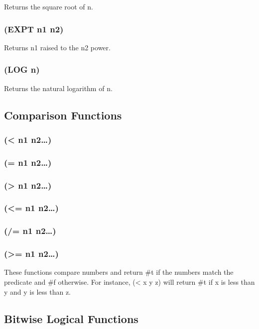 \documentclass[11pt]{article}
\begin{document}
Returns the square root of n.
\subsubsection{(EXPT n1 n2)}
\label{sec-4-25-40}

Returns n1 raised to the n2 power.
\subsubsection{(LOG n)}
\label{sec-4-25-41}

Returns the natural logarithm of n.
\subsection{Comparison Functions}
\label{sec-4-26}

\subsubsection{(< n1 n2\ldots{})}
\label{sec-4-26-1}
\subsubsection{(= n1 n2\ldots{})}
\label{sec-4-26-2}
\subsubsection{(> n1 n2\ldots{})}
\label{sec-4-26-3}
\subsubsection{(<= n1 n2\ldots{})}
\label{sec-4-26-4}
\subsubsection{(/= n1 n2\ldots{})}
\label{sec-4-26-5}
\subsubsection{(>= n1 n2\ldots{})}
\label{sec-4-26-6}

These functions compare numbers and return \#t if the numbers match
the predicate and \#f otherwise.  For instance, (< x y z) will
return \#t if x is less than y and y is less than z.
\subsection{Bitwise Logical Functions}
\label{sec-4-27}
\end{document}
